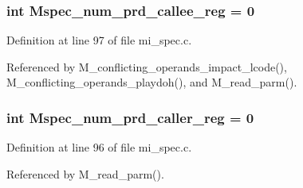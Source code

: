 \subsubsection{\setlength{\rightskip}{0pt plus 5cm}int \bf{Mspec\_\-num\_\-prd\_\-callee\_\-reg} = 0}\label{mi__spec_8c_b75395ef938b5ab6a4c21981b5a3ba8c}




Definition at line 97 of file mi\_\-spec.c.

Referenced by M\_\-conflicting\_\-operands\_\-impact\_\-lcode(), M\_\-conflicting\_\-operands\_\-playdoh(), and M\_\-read\_\-parm().
\subsubsection{\setlength{\rightskip}{0pt plus 5cm}int \bf{Mspec\_\-num\_\-prd\_\-caller\_\-reg} = 0}\label{mi__spec_8c_9ba912056714409fc62897a5acee32d0}




Definition at line 96 of file mi\_\-spec.c.

Referenced by M\_\-read\_\-parm().